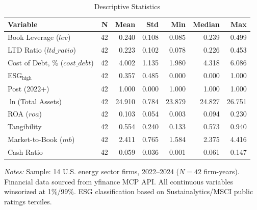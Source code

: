 \begin{table}[htbp]
  \centering
  \caption{Descriptive Statistics}
  \label{tab:descriptive}
  \begin{threeparttable}
  \begin{tabular}{lrrrrrr}
    \toprule
    \textbf{Variable} & \textbf{N} & \textbf{Mean} & \textbf{Std} & \textbf{Min} & \textbf{Median} & \textbf{Max} \\
    \midrule
    Book Leverage ($\mathit{lev}$) & 42 & 0.240 & 0.108 & 0.085 & 0.239 & 0.499 \\
    LTD Ratio ($\mathit{ltd\_ratio}$) & 42 & 0.223 & 0.102 & 0.078 & 0.226 & 0.453 \\
    Cost of Debt, \% ($\mathit{cost\_debt}$) & 42 & 4.002 & 1.135 & 1.980 & 4.318 & 6.086 \\
    ESG$_{\text{high}}$ & 42 & 0.357 & 0.485 & 0.000 & 0.000 & 1.000 \\
    Post (2022+) & 42 & 1.000 & 0.000 & 1.000 & 1.000 & 1.000 \\
    $\ln$(Total Assets) & 42 & 24.910 & 0.784 & 23.879 & 24.827 & 26.751 \\
    ROA ($\mathit{roa}$) & 42 & 0.103 & 0.054 & 0.003 & 0.094 & 0.230 \\
    Tangibility & 42 & 0.554 & 0.240 & 0.133 & 0.573 & 0.940 \\
    Market-to-Book ($\mathit{mb}$) & 42 & 2.411 & 0.765 & 1.584 & 2.375 & 4.416 \\
    Cash Ratio & 42 & 0.059 & 0.036 & 0.001 & 0.061 & 0.147 \\
    \bottomrule
  \end{tabular}
  \begin{tablenotes}
    \small
    \item \textit{Notes:} Sample: 14 U.S. energy sector firms, 2022--2024 ($N=42$ firm-years).
    Financial data sourced from yfinance MCP API. All continuous variables winsorized at 1\%/99\%.
    ESG classification based on Sustainalytics/MSCI public ratings terciles.
  \end{tablenotes}
  \end{threeparttable}
\end{table}
